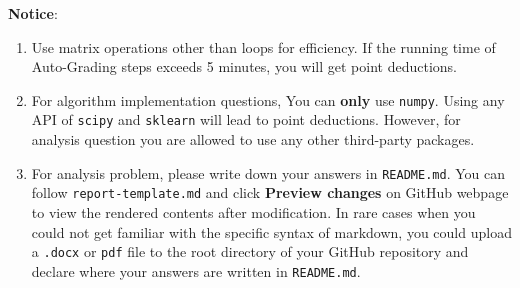 \documentclass[a4paper, 12pt]{exam}
\begin{document}
	\nocite{*}
	\begin{flushleft}
		\textbf{Notice}: \\
		\begin{enumerate}[label=\roman*)]
			\item Use matrix operations other than loops for efficiency. If the running time of Auto-Grading steps exceeds 5 minutes, you will get point deductions.
			\item For algorithm implementation questions, You can \textbf{only} use \texttt{numpy}.
			Using any API of \texttt{scipy} and \texttt{sklearn}
			will lead to point deductions. However,
			for analysis question you are allowed to use any other third-party packages.
			\item For analysis problem, please write down your
			answers in \texttt{README.md}. You can follow \texttt{report-template.md} and click \textbf{Preview changes} on GitHub webpage to view the rendered contents after modification.
			In rare cases when you could not get familiar with the specific syntax
			of markdown, you could upload a \texttt{.docx} or \texttt{pdf} file to the root directory of your GitHub repository and declare where your answers are written in \texttt{README.md}.
		\end{enumerate}
	\end{flushleft}
	
\end{document}
